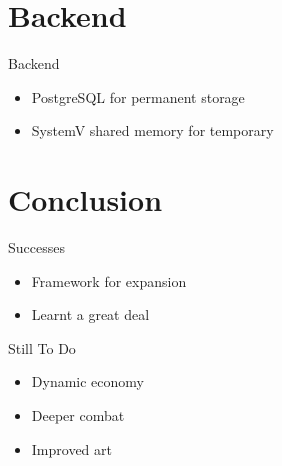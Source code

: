 \section{Backend}
\begin{frame}{Backend}
  \begin{itemize}
    \item PostgreSQL for permanent storage
    \item SystemV shared memory for temporary
  \end{itemize}
\end{frame}

\section{Conclusion}
\begin{frame}{Successes}
  \begin{itemize}
    \item Framework for expansion
    \item Learnt a great deal
  \end{itemize}
\end{frame}

\begin{frame}{Still To Do}
  \begin{itemize}
    \item Dynamic economy
    \item Deeper combat
    \item Improved art
  \end{itemize}
\end{frame}



